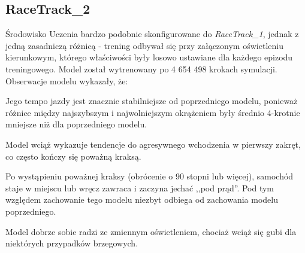 \subsection{RaceTrack\_2}
Środowisko Uczenia bardzo podobnie skonfigurowane do \textit{RaceTrack\_1}, jednak z jedną zasadniczą różnicą - trening odbywał się przy załączonym oświetleniu kierunkowym, którego właściwości były losowo ustawiane dla każdego epizodu treningowego. Model został wytrenowany po 4 654 498 krokach symulacji. Obserwacje modelu wykazały, że:
\begin{enumerate*}
\item Jego tempo jazdy jest znacznie stabilniejsze od poprzedniego modelu, ponieważ różnice między najszybszym i najwolniejszym okrążeniem były średnio 4-krotnie mniejsze niż dla poprzedniego modelu.
\item Model wciąż wykazuje tendencje do agresywnego wchodzenia w pierwszy zakręt, co często kończy się poważną kraksą.
\item Po wystąpieniu poważnej kraksy (obrócenie o 90 stopni lub więcej), samochód staje w miejscu lub wręcz zawraca i zaczyna jechać ,,pod prąd''. Pod tym względem zachowanie tego modelu niezbyt odbiega od zachowania modelu poprzedniego.
\item Model dobrze sobie radzi ze zmiennym oświetleniem, chociaż wciąż się gubi dla niektórych przypadków brzegowych.
\end{enumerate*}

